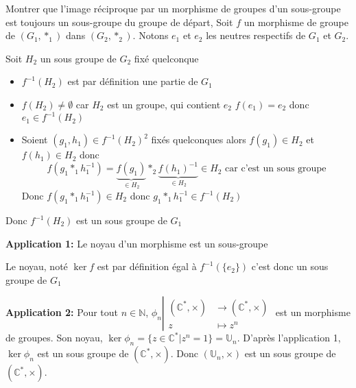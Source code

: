 \documentclass{article}
\begin{document}
\begin{question_kholle}{Montrer que l'image réciproque par un morphisme de groupes d'un sous-groupe est toujours un sous-groupe du groupe de départ, }
    Soit $f$ un morphisme de groupe de $(G_{1},*_{1})$ dans $(G_{2}, *_{2})$. Notons $e_{1}$ et $e_{2}$ les neutres respectifs de $G_{1}$ et $G_{2}$.
    
    Soit $H_{2}$ un sous groupe de $G_{2}$ fixé quelconque
    \begin{itemize}[label=$\star$]
        \item $f^{-1}(H_{2})$ est par définition une partie de $G_{1}$
        \item $f(H_{2}) \neq \emptyset$ car $H_{2}$ est un groupe, qui contient $e_{2}$ $f(e_{1}) = e_{2}$ donc $e_{1} \in f^{-1}(H_{2})$
        \item Soient $(g_{1},h_{1}) \in f^{-1}(H_{2})^{2}$ fixés quelconques
        alors $f(g_{1}) \in H_{2}$ et $f(h_{1}) \in H_{2}$
        donc
        $$
        f(g_{1} *_{1} h_{1}^{-1}) = \underbrace{ f(g_{1}) }_{ \in H_{2} }*_{2}\underbrace{ f(h_{1})^{-1} }_{ \in H_{2} } \in H_{2} \text{ car c'est un sous groupe}$$
        Donc $f(g_{1} *_{1} h_{1}^{-1}) \in H_{2}$ donc $g_{1} *_{1} h_{1}^{-1} \in f^{-1}(H_{2})$
    \end{itemize}
    Donc $f^{-1}(H_{2})$ est un sous groupe de $G_{1}$
\end{question_kholle}
    
\textbf{Application 1:} Le noyau d'un morphisme est un sous-groupe

Le noyau, noté $\ker f$ est par définition égal à $f^{-1}(\{e_2\})$ c'est donc un sous groupe de $G_1$

\textbf{Application 2:} Pour tout $n \in \mathbb{N}$, $\phi _{n}\left|\begin{array}{ll} (\mathbb{C}^{*},\times) &\to (\mathbb{C}^{*},\times) \\ z &\mapsto z^{n} \end{array}\right.$ est un morphisme de groupes. Son noyau, $\ker \phi _n = \{ z \in \mathbb{C}^{*} | z^{n} = 1 \} = \mathbb{U}_{n}$. D'après l'application 1, $\ker \phi_{n}$ est un sous groupe de $(\mathbb{C}^{*}, \times)$. Donc $(\mathbb{U}_{n}, \times)$ est un sous groupe de $(\mathbb{C}^{*},\times)$.
\end{document}
